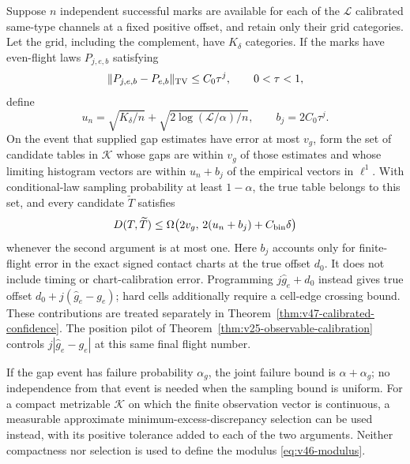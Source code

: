 \begin{corollary}
\label{cor:v46-confidence}
Suppose $n$ independent successful marks are available for each of the
$\mathcal L$ calibrated same-type channels at a fixed positive offset, and
retain only their grid categories.  Let the grid, including the complement,
have $K_\delta$ categories.  If the marks have even-flight laws $P_{j,e,b}$
satisfying
\begin{equation}\label{eq:v46-finite-law-bias}
 \|P_{j,e,b}-P_{e,b}\|_{\rm TV}\le C_0\tau^j,
 \qquad 0<\tau<1,
\end{equation}
define
\[
 u_n=\sqrt{K_\delta/n}+
              \sqrt{2\log(\mathcal L/\alpha)/n},
 \qquad b_j=2C_0\tau^j.
\]
On the event that supplied gap estimates have error at most $v_g$, form the
set of candidate tables in $\mathcal K$ whose gaps are within $v_g$ of
those estimates and whose limiting histogram vectors are within $u_n+b_j$
of the empirical vectors in $\ell^1$.  With conditional-law sampling
probability at least $1-\alpha$, the true table belongs to this set, and
every candidate $\widetilde T$ satisfies
\begin{equation}\label{eq:v46-confidence-radius}
 D(T,\widetilde T)\le
 \Omega\bigl(2v_g,\,2(u_n+b_j)+C_{\rm bin}\delta\bigr)
\end{equation}
whenever the second argument is at most one.  
Here $b_j$ accounts only for finite-flight error in the exact signed
contact charts at the true offset $d_0$.  It does not include timing or
chart-calibration error.  Programming $j\widehat g_e+d_0$ instead gives
true offset $d_0+j(\widehat g_e-g_e)$; hard cells additionally require a
cell-edge crossing bound.  These contributions are treated separately in
Theorem~\ref{thm:v47-calibrated-confidence}.  The position pilot of
Theorem~\ref{thm:v25-observable-calibration} controls
$j|\widehat g_e-g_e|$ at this same final flight number.

If the gap event has failure
probability $\alpha_g$, the joint failure bound is $\alpha+\alpha_g$;
no independence from that event is needed when the sampling bound is uniform.
For a compact metrizable $\mathcal K$ on which the finite observation
vector is continuous, a measurable approximate minimum-excess-discrepancy
selection can be used instead, with its positive tolerance added to each
of the two arguments.  Neither compactness nor selection is used to define
the modulus \eqref{eq:v46-modulus}.
\end{corollary}

